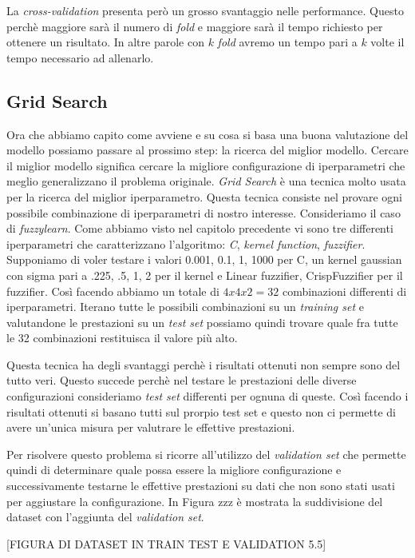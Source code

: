 \documentclass[12pt,italian]{report}
\begin{document}
La \emph{cross-validation} presenta però un grosso svantaggio nelle performance. Questo perchè maggiore sarà il numero di \emph{fold} e maggiore sarà il tempo richiesto per ottenere un risultato. In altre parole con $k$ \emph{fold} avremo un tempo pari a $k$ volte il tempo necessario ad allenarlo.

\subsection{Grid Search}
Ora che abbiamo capito come avviene e su cosa si basa una buona valutazione del modello possiamo passare al prossimo step: la ricerca del miglior modello.
Cercare il miglior modello significa cercare la migliore configurazione di iperparametri che meglio generalizzano il problema originale. 
\emph{Grid Search} è una tecnica molto usata per la ricerca del miglior iperparametro. Questa tecnica consiste nel provare ogni possibile combinazione di iperparametri di nostro interesse. Consideriamo il caso di \emph{fuzzylearn}. Come abbiamo visto nel capitolo precedente vi sono tre differenti iperparametri che caratterizzano l'algoritmo: \emph{C}, \emph{kernel function}, \emph{fuzzifier}. Supponiamo di voler testare i valori 0.001, 0.1, 1, 1000 per C, un kernel gaussian con sigma pari a .225, .5, 1, 2 per il kernel e Linear fuzzifier, CrispFuzzifier per il fuzzifier. Così facendo abbiamo un totale di $ 4 x 4 x 2 = 32 $ combinazioni differenti di iperparametri.
Iterano tutte le possibili combinazioni su un \emph{training set} e valutandone le prestazioni su un \emph{test set} possiamo quindi trovare quale fra tutte le 32 combinazioni restituisca il valore più alto.

Questa tecnica ha degli svantaggi perchè i risultati ottenuti non sempre sono del tutto veri. Questo succede perchè nel testare le prestazioni delle diverse configurazioni consideriamo \emph{test set} differenti per ognuna di queste. Così facendo i risultati ottenuti si basano tutti sul prorpio test set e questo non ci permette di avere un'unica misura per valutrare le effettive prestazioni.

Per risolvere questo problema si ricorre all'utilizzo del \emph{validation set} che permette quindi di determinare quale possa essere la migliore configurazione e successivamente testarne le effettive prestazioni su dati che non sono stati usati per aggiustare la configurazione. In Figura zzz è mostrata la suddivisione del dataset con l'aggiunta del \emph{validation set}.

[FIGURA DI DATASET IN TRAIN TEST E VALIDATION 5.5]
\end{document}
